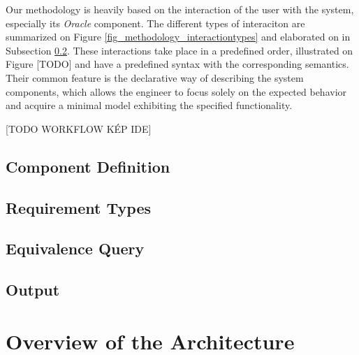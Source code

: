 Our methodology is heavily based on the interaction of the user with the system, especially its \textit{Oracle} component. The different types of interaciton are summarized on Figure \ref{fig_methodology_interactiontypes} and elaborated on in Subsection \ref{subs_reqtypes}. These interactions take place in a predefined order, illustrated on Figure [TODO] and have a predefined syntax with the corresponding semantics. Their common feature is the declarative way of describing the system components, which allows the engineer to focus solely on the expected behavior and acquire a minimal model exhibiting the specified functionality.

[TODO WORKFLOW KÉP IDE] %

\subsection{Component Definition} \label{subs_compdef}

\subsection{Requirement Types} \label{subs_reqtypes}
\subsection{Equivalence Query} \label{subs_eq}
\subsection{Output} \label{subs_resultingmodel}


\section{Overview of the Architecture} \label{sec_architecture}
